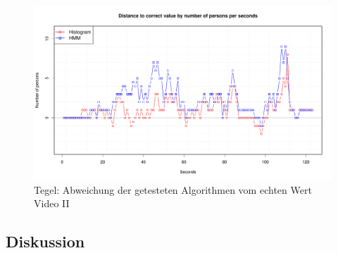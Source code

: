 \begin{figure}
	\centering
\includegraphics[width=1\textwidth]{bilder/safest_plot_tegel_7-55.pdf}
	\caption{Tegel: Abweichung der getesteten Algorithmen vom echten Wert Video II}
	\label{fig:tegel_7-55}
\end{figure}

\subsection{Diskussion}
\label{sec:diskussion}

